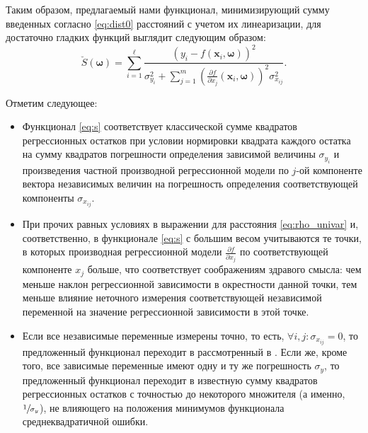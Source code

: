 \documentclass[tikz,10pt,a4paper]{article}
\newcommand{\bomega}{\boldsymbol{\omega}}
\begin{document}
Таким образом, предлагаемый нами функционал, минимизирующий сумму введенных
согласно \eqref{eq:dist0} расстояний с учетом их линеаризации,
для достаточно гладких функций выглядит следующим образом:
\begin{equation}
  \breve{S}(\bomega) = \sum_{i = 1}^\ell \frac{(y_i - f(\mathbf{x}_i, \bomega))^2}{\sigma_{y_i}^2 + \sum_{j = 1}^m (\frac{\partial f}{\partial x_j}(\mathbf{x}_i, \bomega))^2 \sigma^2_{x_{ij}}}.
  \label{eq:s}
\end{equation}

Отметим следующее:
\begin{itemize}
  \item Функционал \eqref{eq:s} соответствует классической сумме квадратов регрессионных
	остатков при условии нормировки квадрата каждого остатка на сумму квадратов погрешности
	определения зависимой величины $\sigma_{y_i}$ и произведения частной производной
	регрессионной модели по $j$-ой компоненте вектора независимых величин на погрешность
	определения соответствующей компоненты $\sigma_{x_{ij}}$.

  \item При прочих равных условиях в выражении для расстояния \eqref{eq:rho_univar} и,
	соответственно, в функционале \eqref{eq:s} с большим весом учитываются те точки, в которых
	производная регрессионной модели $\frac{\partial f}{\partial x_j}$ по соответствующей
	компоненте $x_j$ больше, что соответствует соображениям здравого смысла: чем меньше наклон
	регрессионной зависимости в окрестности данной точки, тем меньше влияние неточного
	измерения соответствующей независимой переменной на значение регрессионной зависимости
	в этой точке.

  \item Если все независимые переменные измерены точно, то есть,
	$\forall i, j : \sigma_{x_{ij}} = 0$, то предложенный функционал переходит в рассмотренный
	в \cite{jukic2013nonlinear}. Если же, кроме того, все зависимые переменные имеют одну и ту
	же погрешность $\sigma_y$,
	то предложенный функционал переходит в известную сумму квадратов регрессионных остатков
	с точностью до некоторого множителя (а именно, $\sfrac{1}{\sigma_y}$), не влияющего на
	положения минимумов функционала среднеквадратичной ошибки.
\end{itemize}
\end{document}
